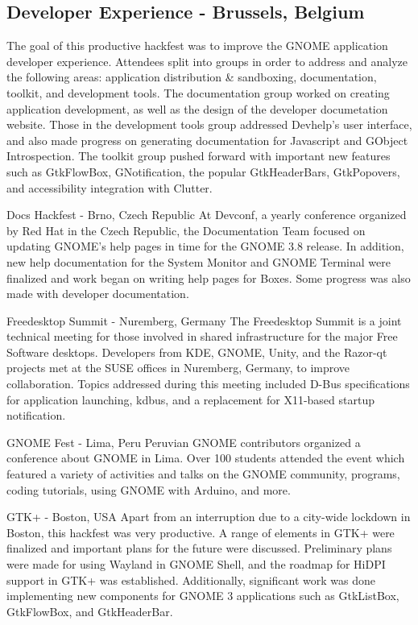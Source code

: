 \documentclass{scrreprt}
\begin{document}
\subsection{Developer Experience - Brussels, Belgium}

The goal of this productive hackfest was to improve the GNOME 
application developer experience. Attendees split into groups in order 
to address and analyze the following areas: application distribution \& 
sandboxing, documentation, toolkit, and development tools. The 
documentation group worked on creating application development, as well 
as the design of the developer documetation website. Those in the 
development tools group addressed Devhelp's user interface, and also 
made progress on generating documentation for Javascript and GObject 
Introspection. The toolkit group pushed forward with important new 
features such as GtkFlowBox, GNotification, the popular GtkHeaderBars, 
GtkPopovers, and accessibility integration with Clutter.

Docs Hackfest - Brno, Czech Republic
At Devconf, a yearly conference organized by Red Hat in the Czech Republic, the Documentation Team focused on updating GNOME's help pages in time for the GNOME 3.8 release. In addition, new help documentation for the System Monitor and GNOME Terminal were finalized and work began on writing help pages for Boxes. Some progress was also made with developer documentation.

Freedesktop Summit - Nuremberg, Germany
The Freedesktop Summit is a joint technical meeting for those involved in shared infrastructure for the major Free Software desktops. Developers from KDE, GNOME, Unity, and the Razor-qt projects met at the SUSE offices in Nuremberg, Germany, to improve collaboration. Topics addressed during this meeting included D-Bus specifications for application launching, kdbus, and a replacement for X11-based startup notification.

GNOME Fest - Lima, Peru
Peruvian GNOME contributors organized a conference about GNOME in Lima. Over 100 students attended the event which featured a variety of activities and talks on the GNOME community, programs, coding tutorials, using GNOME with Arduino, and more.

GTK+ - Boston, USA
Apart from an interruption due to a city-wide lockdown in Boston, this hackfest was very productive. A range of elements in GTK+ were finalized and important plans for the future were discussed. Preliminary plans were made for using Wayland in GNOME Shell, and the roadmap for HiDPI support in GTK+ was established. Additionally, significant work was done implementing new components for GNOME 3 applications such as GtkListBox, GtkFlowBox, and GtkHeaderBar.
\end{document}
